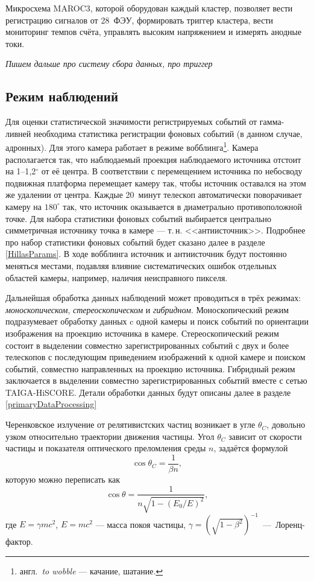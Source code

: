 \documentclass[magd,floatypics,numeref]{msudipl} %
\begin{document}
Микросхема MAROC3, которой оборудован каждый кластер, позволяет вести регистрацию сигналов от 28~ФЭУ, формировать триггер кластера, вести мониторинг темпов счёта, управлять высоким напряжением и измерять анодные токи. 

\textit{Пишем дальше про систему сбора данных, про триггер}
\subsection{Режим наблюдений}
Для оценки статистической значимости регистрируемых событий от гамма-ливней необходима статистика регистрации фоновых событий (в данном случае, адронных). Для этого камера работает в режиме вобблинга\footnote{англ.~\textit{to wobble} --- качание, шатание.}. Камера располагается так, что наблюдаемый проекция наблюдаемого источника отстоит на 1--1{,}2$^{\circ}$ от её центра. В соответствии с перемещением источника по небосводу подвижная платформа перемещает камеру так, чтобы источник оставался на этом же удалении от центра. Каждые 20~минут телескоп автоматически поворачивает камеру на $180^{\circ}$ так, что источник оказывается в диаметрально противоположной точке. Для набора статистики фоновых событий  выбирается центрально симметричная источнику точка в камере --- т.\,н. <<антиисточник>>. Подробнее про набор статистики фоновых событий будет сказано далее в разделе \ref{HillasParams}. В ходе вобблинга источник и антиисточник будут постоянно меняться местами, подавляя влияние систематических ошибок отдельных областей камеры, например, наличия неисправного пикселя.

Дальнейшая обработка данных наблюдений может проводиться в трёх режимах: \textit{моноскопическом}, \textit{стереоскопическом} и \textit{гибридном}. Моноскопический режим подразумевает обработку данных c одной камеры и поиск событий по ориентации изображения на проекцию источника в камере. Стереоскопический режим состоит в выделении совместно зарегистрированных событий с двух и более телескопов с последующим приведением изображений к одной камере и поиском событий, совместно направленных на проекцию источника. Гибридный режим заключается в выделении совместно зарегистрированных событий вместе с сетью TAIGA-HiSCORE. Детали обработки данных будут описаны далее в разделе \ref{primaryDataProcessing}

Черенковское излучение от релятивистских частиц возникает в угле $\theta_C$, довольно узком относительно траектории движения частицы. Угол $\theta_C$ зависит от скорости частицы и показателя оптического преломления среды $n$, задаётся формулой
\begin{equation}
\cos \theta_C=\frac{1}{\beta n},
\end{equation}
которую можно переписать как
\begin{equation}
\cos \theta=\frac{1}{n \sqrt{1-\left(E_{0} / E\right)^{2}}},
\end{equation}
где $E = \gamma m c^2$, $E = mc^2$ --- масса покоя частицы, $\gamma = \left(\sqrt{1-\beta^2}\right)^{-1}$~---~Лоренц-фактор. 
\end{document}
